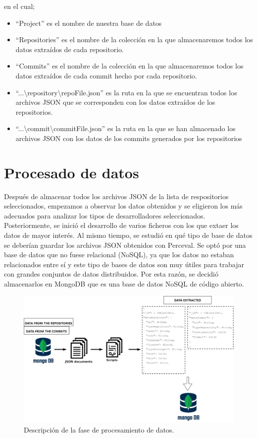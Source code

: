 \documentclass[a4paper, 12pt]{book}
\begin{document}
en el cual;
\begin{itemize}
  \item ``Project'' es el nombre de nuestra base de datos
  \item ``Repositories'' es el nombre de la colección en la que almacenaremos todos los datos extraídos de cada repositorio.
  \item ``Commits'' es el nombre de la colección en la que almacenaremos todos los datos extraídos de cada commit hecho por cada repositorio.
  \item ``...\textbackslash repository\textbackslash repoFile.json'' es la ruta en la que se encuentran todos los archivos JSON que se corresponden con los datos extraídos de los repositorios.
  \item  ``...\textbackslash commit\textbackslash commitFile.json'' es la ruta en la que se han almacenado los archivos JSON con los datos de los commits generados por los repositorios
\end{itemize}

\section{Procesado de datos} %
\label{sec:procesado de datos}

Después de almacenar todos los archivos JSON de la lista de respositorios seleccionados, empezamos a observar los datos obtenidos y se eligieron los más adecuados para analizar los tipos de desarrolladores seleccionados. 
Posteriormente, se inició el desarrollo de varios ficheros con los que extaer los datos de mayor interés. 
Al mismo tiempo, se estudió en qué tipo de base de datos se deberían guardar los archivos JSON obtenidos con Perceval.
Se optó por una base de datos que no fuese relacional (NoSQL), ya que los datos no estaban relacionados entre sí y este tipo de bases de datos son muy útiles para trabajar con grandes conjuntos de datos distribuidos.
Por esta razón, se decidió almacenarlos en MongoDB que es una base de datos NoSQL de código abierto. 

\begin{figure}
  \centering
  \includegraphics[width=16cm, keepaspectratio]{img/procesamiento_datos.png}
  \caption{Descripción de la fase de procesamiento de datos.}\label{fig:procesamiento_datos}
\end{figure}
\end{document}
